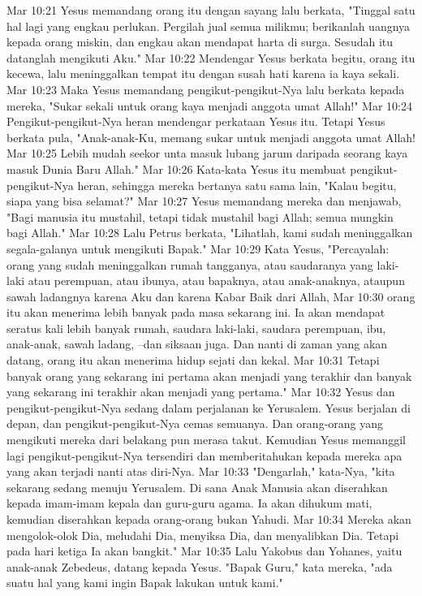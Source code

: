 Mar 10:21  Yesus memandang orang itu dengan sayang lalu berkata, "Tinggal satu hal lagi yang engkau perlukan. Pergilah jual semua milikmu; berikanlah uangnya kepada orang miskin, dan engkau akan mendapat harta di surga. Sesudah itu datanglah mengikuti Aku."
Mar 10:22  Mendengar Yesus berkata begitu, orang itu kecewa, lalu meninggalkan tempat itu dengan susah hati karena ia kaya sekali.
Mar 10:23  Maka Yesus memandang pengikut-pengikut-Nya lalu berkata kepada mereka, "Sukar sekali untuk orang kaya menjadi anggota umat Allah!"
Mar 10:24  Pengikut-pengikut-Nya heran mendengar perkataan Yesus itu. Tetapi Yesus berkata pula, "Anak-anak-Ku, memang sukar untuk menjadi anggota umat Allah!
Mar 10:25  Lebih mudah seekor unta masuk lubang jarum daripada seorang kaya masuk Dunia Baru Allah."
Mar 10:26  Kata-kata Yesus itu membuat pengikut-pengikut-Nya heran, sehingga mereka bertanya satu sama lain, "Kalau begitu, siapa yang bisa selamat?"
Mar 10:27  Yesus memandang mereka dan menjawab, "Bagi manusia itu mustahil, tetapi tidak mustahil bagi Allah; semua mungkin bagi Allah."
Mar 10:28  Lalu Petrus berkata, "Lihatlah, kami sudah meninggalkan segala-galanya untuk mengikuti Bapak."
Mar 10:29  Kata Yesus, "Percayalah: orang yang sudah meninggalkan rumah tangganya, atau saudaranya yang laki-laki atau perempuan, atau ibunya, atau bapaknya, atau anak-anaknya, ataupun sawah ladangnya karena Aku dan karena Kabar Baik dari Allah,
Mar 10:30  orang itu akan menerima lebih banyak pada masa sekarang ini. Ia akan mendapat seratus kali lebih banyak rumah, saudara laki-laki, saudara perempuan, ibu, anak-anak, sawah ladang, --dan siksaan juga. Dan nanti di zaman yang akan datang, orang itu akan menerima hidup sejati dan kekal.
Mar 10:31  Tetapi banyak orang yang sekarang ini pertama akan menjadi yang terakhir dan banyak yang sekarang ini terakhir akan menjadi yang pertama."
Mar 10:32  Yesus dan pengikut-pengikut-Nya sedang dalam perjalanan ke Yerusalem. Yesus berjalan di depan, dan pengikut-pengikut-Nya cemas semuanya. Dan orang-orang yang mengikuti mereka dari belakang pun merasa takut. Kemudian Yesus memanggil lagi pengikut-pengikut-Nya tersendiri dan memberitahukan kepada mereka apa yang akan terjadi nanti atas diri-Nya.
Mar 10:33  "Dengarlah," kata-Nya, "kita sekarang sedang menuju Yerusalem. Di sana Anak Manusia akan diserahkan kepada imam-imam kepala dan guru-guru agama. Ia akan dihukum mati, kemudian diserahkan kepada orang-orang bukan Yahudi.
Mar 10:34  Mereka akan mengolok-olok Dia, meludahi Dia, menyiksa Dia, dan menyalibkan Dia. Tetapi pada hari ketiga Ia akan bangkit."
Mar 10:35  Lalu Yakobus dan Yohanes, yaitu anak-anak Zebedeus, datang kepada Yesus. "Bapak Guru," kata mereka, "ada suatu hal yang kami ingin Bapak lakukan untuk kami."
